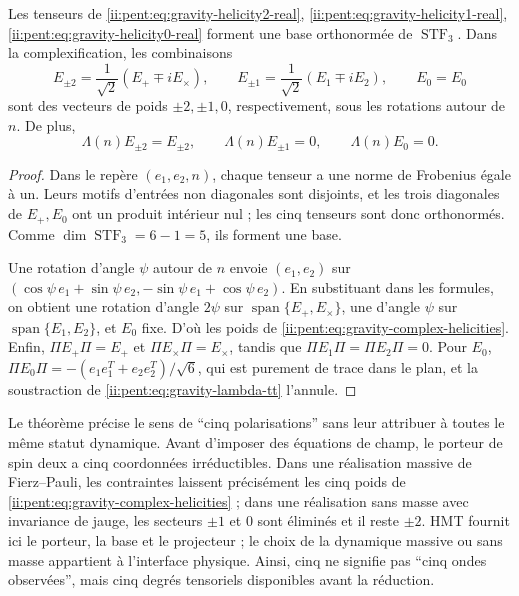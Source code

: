 \begin{theorem}
\label{ii:pent:thm:gravity-five-helicities}
Les tenseurs de
\eqref{ii:pent:eq:gravity-helicity2-real}, \eqref{ii:pent:eq:gravity-helicity1-real}, \eqref{ii:pent:eq:gravity-helicity0-real}
forment une base orthonormée de \(\operatorname{STF}_3\). Dans la
complexification, les combinaisons
\begin{equation}
\label{ii:pent:eq:gravity-complex-helicities}
E_{\pm2}=\frac1{\sqrt2}(E_+\mp i E_\times),
\qquad
E_{\pm1}=\frac1{\sqrt2}(E_1\mp i E_2),
\qquad E_0=E_0
\end{equation}
sont des vecteurs de poids \(\pm2,\pm1,0\), respectivement, sous les rotations
autour de \(n\). De plus,
\begin{equation}
\label{ii:pent:eq:gravity-tt-on-five}
\Lambda(n)E_{\pm2}=E_{\pm2},
\qquad
\Lambda(n)E_{\pm1}=0,
\qquad
\Lambda(n)E_0=0.
\end{equation}
\end{theorem}

\begin{proof}
Dans le repère \((e_1,e_2,n)\), chaque tenseur a une norme de Frobenius égale à un.
Leurs motifs d’entrées non diagonales sont disjoints, et les trois diagonales
de \(E_+,E_0\) ont un produit intérieur nul ; les cinq tenseurs
sont donc orthonormés. Comme \(\dim\operatorname{STF}_3=6-1=5\), ils forment une base.

Une rotation d’angle \(\psi\) autour de \(n\) envoie
\((e_1,e_2)\) sur
\((\cos\psi\,e_1+\sin\psi\,e_2,
-\sin\psi\,e_1+\cos\psi\,e_2)\). En substituant dans les formules, on obtient
une rotation d’angle \(2\psi\) sur
\(\operatorname{span}\{E_+,E_\times\}\), une d’angle \(\psi\) sur
\(\operatorname{span}\{E_1,E_2\}\), et \(E_0\) fixe. D’où les poids de
\eqref{ii:pent:eq:gravity-complex-helicities}. Enfin,
\(\Pi E_{+}\Pi=E_+\) et \(\Pi E_\times\Pi=E_\times\), tandis que
\(\Pi E_1\Pi=\Pi E_2\Pi=0\). Pour \(E_0\),
\(\Pi E_0\Pi=-(e_1e_1^T+e_2e_2^T)/\sqrt6\), qui est purement de trace dans
le plan, et la soustraction de \eqref{ii:pent:eq:gravity-lambda-tt} l’annule.
\end{proof}

Le théorème précise le sens de ``cinq polarisations'' sans leur attribuer
à toutes le même statut dynamique. Avant d’imposer des équations de champ,
le porteur de spin deux a cinq coordonnées irréductibles. Dans une
réalisation massive de Fierz--Pauli, les contraintes laissent précisément
les cinq poids de \eqref{ii:pent:eq:gravity-complex-helicities} ; dans une réalisation
sans masse avec invariance de jauge, les secteurs \(\pm1\) et \(0\) sont éliminés et
il reste \(\pm2\). HMT fournit ici le porteur, la base et le projecteur ;
le choix de la dynamique massive ou sans masse appartient à l’interface
physique. Ainsi, cinq ne signifie pas ``cinq ondes observées'', mais cinq
degrés tensoriels disponibles avant la réduction.


